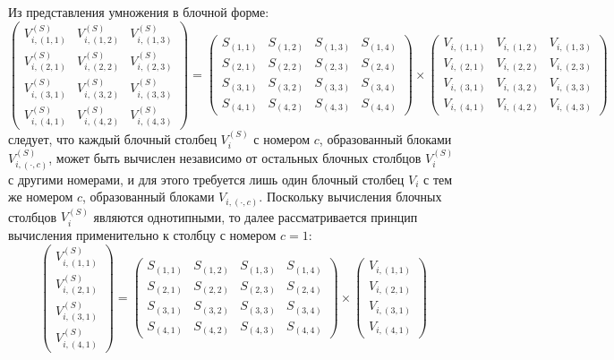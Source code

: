 Из представления умножения в блочной форме:
$$
	\begin{pmatrix}
		V_{i,(1,1)}^{(S)} & V_{i,(1,2)}^{(S)} & V_{i,(1,3)}^{(S)} \\
		V_{i,(2,1)}^{(S)} & V_{i,(2,2)}^{(S)} & V_{i,(2,3)}^{(S)} \\
		V_{i,(3,1)}^{(S)} & V_{i,(3,2)}^{(S)} & V_{i,(3,3)}^{(S)} \\
		V_{i,(4,1)}^{(S)} & V_{i,(4,2)}^{(S)} & V_{i,(4,3)}^{(S)}
	\end{pmatrix}
	=
	\begin{pmatrix}
		S_{(1,1)} & S_{(1,2)} & S_{(1,3)} & S_{(1,4)} \\
		S_{(2,1)} & S_{(2,2)} & S_{(2,3)} & S_{(2,4)} \\
		S_{(3,1)} & S_{(3,2)} & S_{(3,3)} & S_{(3,4)} \\
		S_{(4,1)} & S_{(4,2)} & S_{(4,3)} & S_{(4,4)}
	\end{pmatrix}
	\times
	\begin{pmatrix}
		V_{i,(1,1)} & V_{i,(1,2)} & V_{i,(1,3)} \\
		V_{i,(2,1)} & V_{i,(2,2)} & V_{i,(2,3)} \\
		V_{i,(3,1)} & V_{i,(3,2)} & V_{i,(3,3)} \\
		V_{i,(4,1)} & V_{i,(4,2)} & V_{i,(4,3)}
	\end{pmatrix}
$$
следует, что каждый блочный столбец $V_i^{(S)}$ с номером $c$, образованный блоками $V_{i,(\cdot,c)}^{(S)}$, может быть вычислен независимо от остальных блочных столбцов
$V_i^{(S)}$ с другими номерами, и для этого требуется лишь один блочный столбец $V_i$ с тем же номером $c$, образованный блоками $V_{i,(\cdot,c)}$. Поскольку вычисления блочных
столбцов $V_i^{(S)}$ являются однотипными, то далее рассматривается принцип вычисления применительно к столбцу с номером $c=1$:
$$
	\begin{pmatrix}
		V_{i,(1,1)}^{(S)} \\
		V_{i,(2,1)}^{(S)} \\
		V_{i,(3,1)}^{(S)} \\
		V_{i,(4,1)}^{(S)}
	\end{pmatrix}
	=
	\begin{pmatrix}
		S_{(1,1)} & S_{(1,2)} & S_{(1,3)} & S_{(1,4)} \\
		S_{(2,1)} & S_{(2,2)} & S_{(2,3)} & S_{(2,4)} \\
		S_{(3,1)} & S_{(3,2)} & S_{(3,3)} & S_{(3,4)} \\
		S_{(4,1)} & S_{(4,2)} & S_{(4,3)} & S_{(4,4)}
	\end{pmatrix}
	\times
	\begin{pmatrix}
		V_{i,(1,1)} \\
		V_{i,(2,1)} \\
		V_{i,(3,1)} \\
		V_{i,(4,1)}
	\end{pmatrix}
$$
